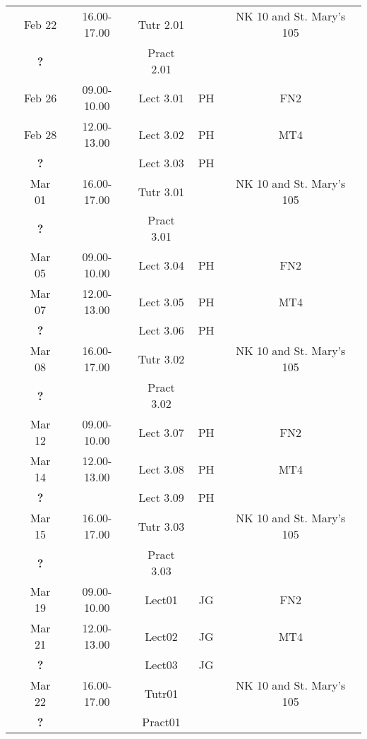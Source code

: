 \documentclass[11pt,oneside,a4paper]{article}
\begin{document}
\begin{center}
\begin{tabular}{||c||c|c|c|c|c||}
                                      & Feb 22   & 16.00-17.00 & Tutr  2.01  &     & NK 10 and St. Mary's 105 \\
                                      &  {\bf ?} &             & Pract 2.01  &     &     \\
\hline
\multirow{6}{*}{\color{red}{Week 34}} & Feb 26   & 09.00-10.00 & Lect  3.01  & PH  & FN2 \\
                                      & Feb 28   & 12.00-13.00 & Lect  3.02  & PH  & MT4 \\
                                      &  {\bf ?} &             & Lect  3.03  & PH  &     \\
                                      & Mar 01   & 16.00-17.00 & Tutr  3.01  &     & NK 10 and St. Mary's 105 \\
                                      &  {\bf ?} &             & Pract 3.01  &     &     \\
\hline
\multirow{6}{*}{\color{red}{Week 35}} & Mar 05   & 09.00-10.00 & Lect  3.04  & PH  & FN2 \\
                                      & Mar 07   & 12.00-13.00 & Lect  3.05  & PH  & MT4 \\
                                      &  {\bf ?} &             & Lect  3.06  & PH  &     \\
                                      & Mar 08   & 16.00-17.00 & Tutr  3.02  &     & NK 10 and St. Mary's 105 \\
                                      &  {\bf ?} &             & Pract 3.02  &     &     \\
\hline
\multirow{6}{*}{\color{red}{Week 36}} & Mar 12   & 09.00-10.00 & Lect  3.07  & PH  & FN2 \\
                                      & Mar 14   & 12.00-13.00 & Lect  3.08  & PH  & MT4 \\
                                      &  {\bf ?} &             & Lect  3.09  & PH  &     \\
                                      & Mar 15   & 16.00-17.00 & Tutr  3.03  &     & NK 10 and St. Mary's 105 \\
                                      &  {\bf ?} &             & Pract 3.03  &     &     \\
\hline
\multirow{6}{*}{\color{red}{Week 37}} & Mar 19   & 09.00-10.00 & Lect01  & JG & FN2 \\
                                      & Mar 21   & 12.00-13.00 & Lect02  & JG & MT4 \\
                                      &  {\bf ?} &             & Lect03  & JG &     \\
                                      & Mar 22   & 16.00-17.00 & Tutr01  &    & NK 10 and St. Mary's 105 \\
                                      &  {\bf ?} &             & Pract01 &    &     \\


\hline
\hline\hline

\end{tabular}
\end{center}
\end{document}
